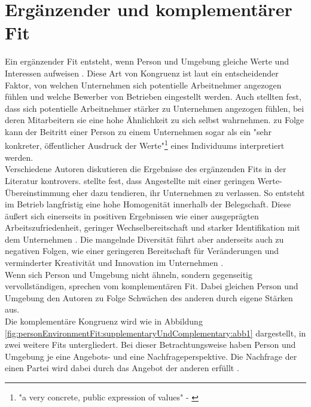 \section{Ergänzender und komplementärer Fit}
\label{ch:personEnvironmentFit:supplementaryUndComplementary}
Ein ergänzender Fit entsteht, wenn Person und Umgebung gleiche Werte und Interessen aufweisen \cite[S. 2f.]{muchinsky:1987}. Diese Art von Kongruenz ist laut \textcite[S. 1ff.]{schneider:1987} ein entscheidender Faktor, von welchen Unternehmen sich potentielle Arbeitnehmer angezogen fühlen und welche Bewerber von Betrieben eingestellt werden. Auch \textcite[S. 7]{devendorf:2008} stellten fest, dass sich potentielle Arbeitnehmer stärker zu Unternehmen angezogen fühlen, bei deren Mitarbeitern sie eine hohe Ähnlichkeit zu sich selbst wahrnehmen. \textcite[S. 4]{popovich:1982} zu Folge kann der Beitritt einer Person zu einem Unternehmen sogar als ein "sehr konkreter, öffentlicher Ausdruck der Werte"\footnote{"a very concrete, public expression of values" - \textcite[S. 4]{popovich:1982}} eines Individuums interpretiert werden.\\
Verschiedene Autoren diskutieren die Ergebnisse des ergänzenden Fits in der Literatur kontrovers. \textcite[S. 6]{schneider:1987} stellte fest, dass Angestellte mit einer geringen Werte-Übereinstimmung eher dazu tendieren, ihr Unternehmen zu verlassen. So entsteht im Betrieb langfristig eine hohe Homogenität innerhalb der Belegschaft. Diese äußert sich einerseits in positiven Ergebnissen wie einer ausgeprägten Arbeitszufriedenheit, geringer Wechselbereitschaft und starker Identifikation mit dem Unternehmen \cite[S. 25ff.]{kristof:1996}\cite[S. 5]{su:2015}. Die mangelnde Diversität führt aber anderseits auch zu negativen Folgen, wie einer geringeren Bereitschaft für Veränderungen \cite[S. 10]{schneider:1987} und verminderter Kreativität und Innovation im Unternehmen \cite[S. 7]{chatman:1998}.\\
Wenn sich Person und Umgebung nicht ähneln, sondern gegenseitig vervollständigen, sprechen \textcite[S. 4]{muchinsky:1987} vom komplementären Fit. Dabei gleichen Person und Umgebung den Autoren zu Folge Schwächen des anderen durch eigene Stärken aus.\\
Die komplementäre Kongruenz wird wie in Abbildung \ref{fig:personEnvironmentFit:supplementaryUndComplementary:abb1} dargestellt, in zwei weitere Fits untergliedert. Bei dieser Betrachtungsweise haben Person und Umgebung je eine Angebots- und eine Nachfrageperspektive. Die Nachfrage der einen Partei wird dabei durch das Angebot der anderen erfüllt \cite[S. 2ff.]{caplan:1987}\cite[S. 2f.]{edwards:1991}.\\
